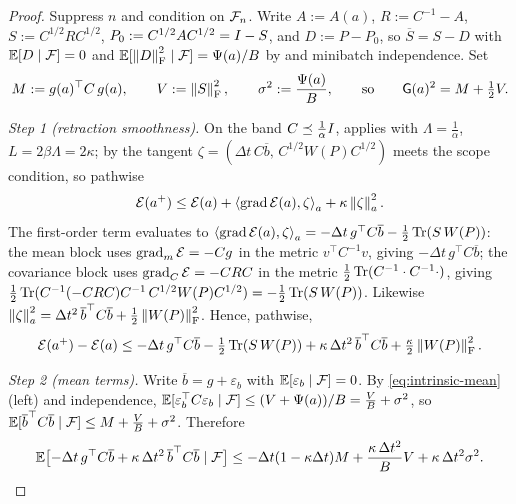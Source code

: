 \begin{proof}
Suppress $n$ and condition on $\mathcal{F}_n$. Write $A:=A(a)$, $R:=C^{-1}-A$, $S:=C^{1/2}RC^{1/2}$,
$P_0:=C^{1/2}AC^{1/2}=I-S$, and $D:=P-P_0$, so $\overline S=S-D$ with $\mathbb{E}[D\mid\mathcal{F}]=0$ and
$\mathbb{E}[\left\lVert D\right\rVert_{\mathrm{F}}^2\mid\mathcal{F}]=\Psi(a)/B$ by  and minibatch independence. Set
\[
    M:=g(a)^\top C\,g(a),\qquad V:=\left\lVert S\right\rVert_{\mathrm{F}}^2,\qquad\sigma^2:=\frac{\Psi(a)}B,
    \qquad\text{so}\qquad\mathsf{G}(a)^2=M+\tfrac12V .
\]

\emph{Step 1 (retraction smoothness).} On the band $C\preceq\tfrac1\alpha I$, 
applies with $\Lambda=\tfrac1\alpha$, $L=2\beta\Lambda=2\kappa$; by  the tangent
$\zeta=(\Delta t\,C\overline b,\,C^{1/2}W(P)C^{1/2})$ meets the scope condition, so pathwise
\[
    \mathcal{E}(a^+)\leq\mathcal{E}(a)+\left\langle \operatorname{grad}\mathcal{E}(a),\zeta\right\rangle_a+\kappa\left\lVert \zeta\right\rVert_a^2 .
\]
The first-order term evaluates to
$\left\langle \operatorname{grad}\mathcal{E}(a),\zeta\right\rangle_a=-\Delta t\,g^\top C\overline b-\tfrac12\operatorname{Tr}(S\,W(P))$: the mean block uses
$\operatorname{grad}_m\mathcal{E}=-Cg$ in the metric $v^\top C^{-1}v$, giving $-\Delta t\,g^\top C\overline b$; the covariance
block uses $\operatorname{grad}_C\mathcal{E}=-CRC$ in the metric $\tfrac12\operatorname{Tr}(C^{-1}\cdot C^{-1}\cdot)$, giving
$\tfrac12\operatorname{Tr}(C^{-1}(-CRC)C^{-1}\,C^{1/2}W(P)C^{1/2})=-\tfrac12\operatorname{Tr}(S\,W(P))$. Likewise
$\left\lVert \zeta\right\rVert_a^2=\Delta t^2\,\overline b^\top C\overline b+\tfrac12\left\lVert W(P)\right\rVert_{\mathrm{F}}^2$. Hence, pathwise,
\begin{equation}
\label{eq:KL-pathwise}
    \mathcal{E}(a^+)-\mathcal{E}(a)
    \leq-\Delta t\,g^\top C\overline b-\tfrac12\operatorname{Tr}(S\,W(P))
    +\kappa\,\Delta t^2\,\overline b^\top C\overline b+\tfrac\kappa2\left\lVert W(P)\right\rVert_{\mathrm{F}}^2 .
\end{equation}

\emph{Step 2 (mean terms).} Write $\overline b=g+\varepsilon_b$ with $\mathbb{E}[\varepsilon_b\mid\mathcal{F}]=0$.
By \eqref{eq:intrinsic-mean}(left) and independence,
$\mathbb{E}[\varepsilon_b^\top C\varepsilon_b\mid\mathcal{F}]\leq(V+\Psi(a))/B=\tfrac VB+\sigma^2$, so
$\mathbb{E}[\overline b^\top C\overline b\mid\mathcal{F}]\leq M+\tfrac VB+\sigma^2$. Therefore
\begin{equation}
\label{eq:KL-mean}
    \mathbb{E}\bigl[-\Delta t\,g^\top C\overline b+\kappa\,\Delta t^2\,\overline b^\top C\overline b\mid\mathcal{F}\bigr]
    \leq-\Delta t(1-\kappa\Delta t)M+\frac{\kappa\,\Delta t^2}BV+\kappa\,\Delta t^2\sigma^2 .
\end{equation}


\end{proof}
